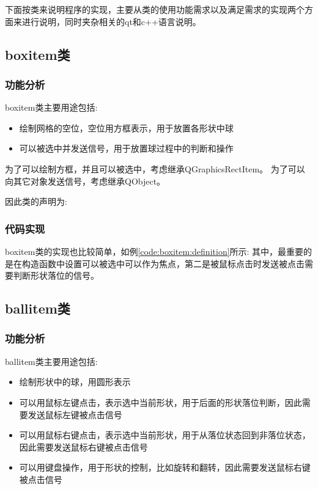 \documentclass[11pt,twoside]{article} %
\begin{document}
下面按类来说明程序的实现，主要从类的使用功能需求以及满足需求的实现两个方面来进行说明，同时夹杂相关的qt和c++语言说明。

\subsection{boxitem类}
\subsubsection{功能分析}
boxitem类主要用途包括:
\begin{itemize}
  \item 绘制网格的空位，空位用方框表示，用于放置各形状中球
  \item 可以被选中并发送信号，用于放置球过程中的判断和操作
\end{itemize}

为了可以绘制方框，并且可以被选中，考虑继承QGraphicsRectItem。
为了可以向其它对象发送信号，考虑继承QObject。

因此类的声明为:


\subsubsection{代码实现}
boxitem类的实现也比较简单，如例\ref{code:boxitem:definition}所示:
其中，最重要的是在构造函数中设置可以被选中可以作为焦点，第二是被鼠标点击时发送被点击需要判断形状落位的信号。


\subsection{ballitem类}
\subsubsection{功能分析}
ballitem类主要用途包括:
\begin{itemize}
  \item 绘制形状中的球，用圆形表示
  \item 可以用鼠标左键点击，表示选中当前形状，用于后面的形状落位判断，因此需要发送鼠标左键被点击信号
  \item 可以用鼠标右键点击，表示选中当前形状，用于从落位状态回到非落位状态，因此需要发送鼠标右键被点击信号
  \item 可以用键盘操作，用于形状的控制，比如旋转和翻转，因此需要发送鼠标右键被点击信号
\end{itemize}
\end{document}
